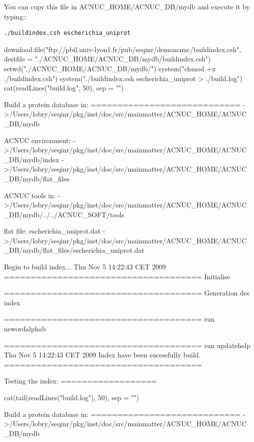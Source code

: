 \documentclass{article}
\begin{document}
\begin{itemize}
You can copy this file in ACNUC\_HOME/ACNUC\_DB/mydb and execute it by typing::

\begin{verbatim}
./buildindex.csh escherichia_uniprot
\end{verbatim}

\begin{Schunk}
\begin{Sinput}
 download.file("ftp://pbil.univ-lyon1.fr/pub/seqinr/demoacnuc/buildindex.csh", 
     destfile = "./ACNUC_HOME/ACNUC_DB/mydb/buildindex.csh")
 setwd("./ACNUC_HOME/ACNUC_DB/mydb/")
 system("chmod +x ./buildindex.csh")
 system("./buildindex.csh escherichia_uniprot >  ./build.log")
 cat(readLines("build.log", 50), sep = "\n")
\end{Sinput}
\begin{Soutput}
 Build a protein database in:
 ============================
 ->/Users/lobry/seqinr/pkg/inst/doc/src/mainmatter/ACNUC_HOME/ACNUC_DB/mydb
 
ACNUC environment:
 ->/Users/lobry/seqinr/pkg/inst/doc/src/mainmatter/ACNUC_HOME/ACNUC_DB/mydb/index
 ->/Users/lobry/seqinr/pkg/inst/doc/src/mainmatter/ACNUC_HOME/ACNUC_DB/mydb/flat_files
 
ACNUC tools in:
 ->/Users/lobry/seqinr/pkg/inst/doc/src/mainmatter/ACNUC_HOME/ACNUC_DB/mydb/../../ACNUC_SOFT/tools
 
flat file: escherichia_uniprot.dat
 ->/Users/lobry/seqinr/pkg/inst/doc/src/mainmatter/ACNUC_HOME/ACNUC_DB/mydb/flat_files/escherichia_uniprot.dat
 
Begin to build index...
Thu Nov  5 14:22:43 CET 2009
=====================================
Initialise

=====================================
Generation des index

=====================================
run newordalphab


=====================================
run updatehelp
Thu Nov  5 14:22:43 CET 2009
Index have been sucessfully build.
=====================================
 
Testing the index:
==================
\end{Soutput}
\begin{Sinput}
 cat(tail(readLines("build.log"), 50), sep = "\n")
\end{Sinput}
\begin{Soutput}
 Build a protein database in:
 ============================
 ->/Users/lobry/seqinr/pkg/inst/doc/src/mainmatter/ACNUC_HOME/ACNUC_DB/mydb
 

\end{Soutput}
\end{Schunk}
\end{itemize}
\end{document}
